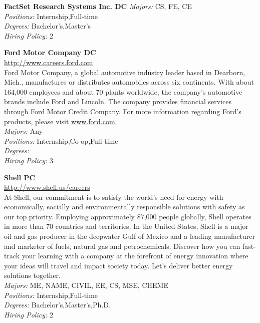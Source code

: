 \documentclass[twoside]{article}
\begin{document}
\begin{center}
\begin{multicols}{2}
\begin{minipage}{.95\columnwidth}{\Large\bf FactSet Research Systems Inc. \hfill DC}
    \emph{Majors:} CS, FE, CE\\
    \emph{Positions:} Internship,Full-time\\
    \emph{Degrees:} Bachelor's,Master's\\
    \emph{Hiring Policy:} 2\\
\end{minipage}
 \begin{minipage}{.95\columnwidth}{\Large\bf Ford Motor Company \hfill DC}\\
    \url{http://www.careers.ford.com}\\
    Ford Motor Company, a global automotive industry leader based in Dearborn, Mich., manufactures or distributes automobiles across six continents. With about 164,000 employees and about 70 plants worldwide, the company's automotive brands include Ford and Lincoln. The company provides financial services through Ford Motor Credit Company. For more information regarding Ford's products, please visit \url{www.ford.com.}\\
    \emph{Majors:} Any\\
    \emph{Positions:} Internship,Co-op,Full-time\\
    \emph{Degrees:} \\
    \emph{Hiring Policy:} 3\\
\end{minipage}
 \begin{minipage}{.95\columnwidth}{\Large\bf Shell \hfill PC}\\
    \url{http://www.shell.us/careers}\\
    At Shell, our commitment is to satisfy the world’s need for energy with economically, socially and environmentally responsible solutions with safety as our top priority. Employing approximately 87,000 people globally, Shell operates in more than 70 countries and territories. In the United States, Shell is a major oil and gas producer in the deepwater Gulf of Mexico and a leading manufacturer and marketer of fuels, natural gas and petrochemicals. Discover how you can fast-track your learning with a company at the forefront of energy innovation where your ideas will travel and impact society today. Let’s deliver better energy solutions together.\\
    \emph{Majors:} ME, NAME, CIVIL, EE, CS, MSE, CHEME\\
    \emph{Positions:} Internship,Full-time\\
    \emph{Degrees:} Bachelor's,Master's,Ph.D.\\
    \emph{Hiring Policy:} 2\\
\end{minipage}
 \end{multicols}\end{center}
\end{document}

